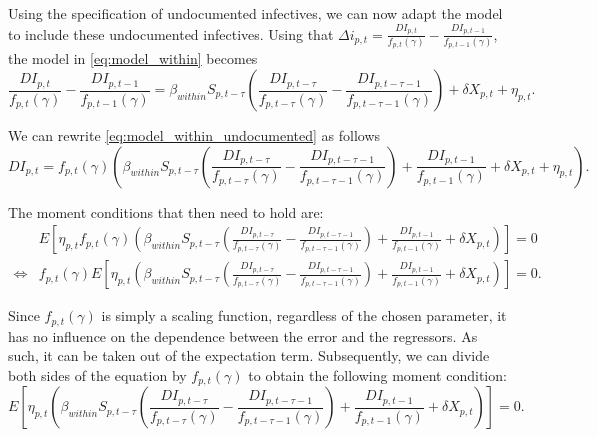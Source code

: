 \documentclass[12pt]{article}
\begin{document}
	Using the specification of undocumented infectives, we can now adapt the model to include these undocumented infectives. Using that $\Delta i_{p,t} = \frac{DI_{p,t}}{f_{p,t}(\gamma)} - \frac{DI_{p,t-1}}{f_{p,t-1}(\gamma)}$, the model in \eqref{eq:model_within} becomes
	    \begin{equation} \label{eq:model_within_undocumented}
		    \frac{DI_{p,t}}{f_{p,t}(\gamma)} - \frac{DI_{p,t-1}}{f_{p,t-1}(\gamma)} = \beta_{within}S_{p,t-\tau}\left(\frac{DI_{p,t-\tau}}{f_{p,t-\tau}(\gamma)} - \frac{DI_{p,t-\tau-1}}{f_{p,t-\tau-1}(\gamma)}\right) + \delta X_{p,t} + \eta_{p,t}.
	    \end{equation}
	    
	We can rewrite \eqref{eq:model_within_undocumented} as follows
	    \begin{equation*}
	       DI_{p,t} = f_{p,t}(\gamma)\left(\beta_{within}S_{p,t-\tau}\left(\frac{DI_{p,t-\tau}}{f_{p,t-\tau}(\gamma)} - \frac{DI_{p,t-\tau-1}}{f_{p,t-\tau-1}(\gamma)}\right) + \frac{DI_{p,t-1}}{f_{p,t-1}(\gamma)} + \delta X_{p,t} + \eta_{p,t}\right).
	    \end{equation*}
	    
	The moment conditions that then need to hold are:
	    \begin{align*}
	        & E\left[ \eta_{p,t}f_{p,t}(\gamma) \left( \beta_{within}S_{p,t-\tau}\left(\frac{DI_{p,t-\tau}}{f_{p,t-\tau}(\gamma)} - \frac{DI_{p,t-\tau-1}}{f_{p,t-\tau-1}(\gamma)}\right) + \frac{DI_{p,t-1}}{f_{p,t-1}(\gamma)} + \delta X_{p,t} \right) \right] = 0 \\
	        \iff & f_{p,t}(\gamma) E\left[ \eta_{p,t}\left( \beta_{within}S_{p,t-\tau}\left(\frac{DI_{p,t-\tau}}{f_{p,t-\tau}(\gamma)} - \frac{DI_{p,t-\tau-1}}{f_{p,t-\tau-1}(\gamma)}\right) + \frac{DI_{p,t-1}}{f_{p,t-1}(\gamma)} + \delta X_{p,t} \right) \right] = 0.
	    \end{align*}
	
	Since $f_{p,t}(\gamma)$ is simply a scaling function, regardless of the chosen parameter, it has no influence on the dependence between the error and the regressors. As such, it can be taken out of the expectation term. Subsequently, we can divide both sides of the equation by $f_{p,t}(\gamma)$ to obtain the following moment condition:
	    \begin{equation} \label{eq:model_within_undocumented_moments}
	        E\left[ \eta_{p,t}\left( \beta_{within}S_{p,t-\tau}\left(\frac{DI_{p,t-\tau}}{f_{p,t-\tau}(\gamma)} - \frac{DI_{p,t-\tau-1}}{f_{p,t-\tau-1}(\gamma)}\right) + \frac{DI_{p,t-1}}{f_{p,t-1}(\gamma)} + \delta X_{p,t} \right) \right] = 0.
	    \end{equation}
	
\end{document}
